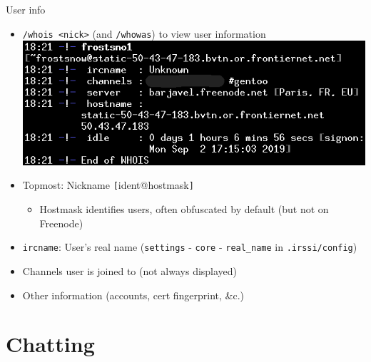 \documentclass{beamer}
\begin{document}
\begin{frame}[fragile=singleslide]{User info}
\begin{itemize}
	\item \texttt{/whois <nick>} (and \texttt{/whowas}) to view user information
	\includegraphics[scale=1.75]{whois.png}
	\item Topmost: Nickname \verb|[|ident@hostmask\verb|]|
	\begin{itemize}
		\item Hostmask identifies users, often obfuscated by default (but not on Freenode)
	\end{itemize}
	\item \texttt{ircname}: User's real name (\texttt{settings} - \texttt{core} - \texttt{real\_name} in \texttt{.irssi/config})
	\item Channels user is joined to (not always displayed)
	\item Other information (accounts, cert fingerprint, \&c.)
\end{itemize}
\end{frame}

\section{Chatting}
\end{document}
